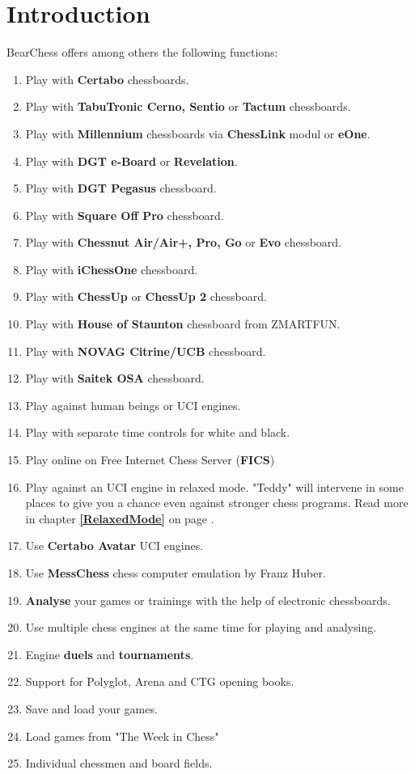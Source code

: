\documentclass[11pt,a4paper]{article}
\begin{document}
	\section{Introduction}
	BearChess offers among others the following functions:
	\begin{enumerate}
		\item Play with \textbf{Certabo} chessboards.
		\item Play with \textbf{TabuTronic Cerno, Sentio} or \textbf{Tactum} chessboards.	  
		\item Play with \textbf{Millennium} chessboards via \textbf{ChessLink} modul or \textbf{eOne}.
		\item Play with \textbf{DGT e-Board} or \textbf{Revelation}.	  
		\item Play with \textbf{DGT Pegasus} chessboard.	  
		\item Play with \textbf{Square Off Pro} chessboard.	  	  
		\item Play with \textbf{Chessnut Air/Air+, Pro, Go} or \textbf{Evo}  chessboard.	  	  	  
		\item Play with \textbf{iChessOne} chessboard.	  	  	  	  
		\item Play with \textbf{ChessUp} or \textbf{ChessUp 2} chessboard.	  	  	  	  	  
        \item Play with \textbf{House of Staunton} chessboard from ZMARTFUN.
		\item Play with \textbf{NOVAG Citrine/UCB} chessboard.
		\item Play with \textbf{Saitek OSA} chessboard.	  
		\item Play against human beings or UCI engines.
		\item Play with separate time controls for white and black.
		\item Play online on Free Internet Chess Server (\textbf{FICS})
		\item Play against an UCI engine in relaxed mode. "Teddy" will intervene in some places to give you a chance even against stronger chess programs. Read more in chapter \textbf{\ref{RelaxedMode}  } on page \pageref{RelaxedMode}.  	  
		\item Use \textbf{Certabo Avatar} UCI engines.  	  
		\item Use \textbf{MessChess} chess computer emulation by Franz Huber.  	    	  
		\item \textbf{Analyse} your games or trainings with the help of electronic chessboards.
		\item Use multiple chess engines at the same time for playing and analysing.
		\item Engine \textbf{duels} and \textbf{tournaments}.
		\item Support for Polyglot, Arena and CTG opening books.
		\item Save and load your games.
		\item Load games from "The Week in Chess"
		\item Individual chessmen and board fields.
	\end{enumerate}
	
\end{document}
